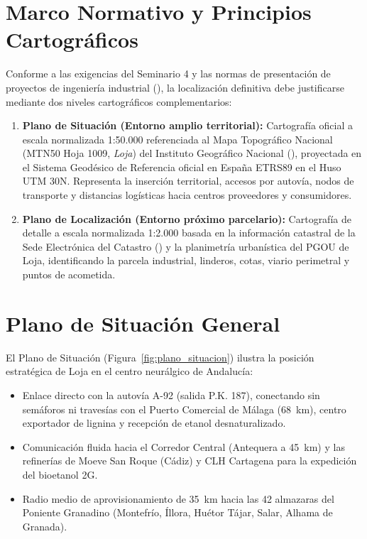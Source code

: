\documentclass{report}
\begin{document}
\section{Marco Normativo y Principios Cartográficos}
Conforme a las exigencias del Seminario 4 y las normas de presentación de proyectos de ingeniería industrial (\textcite{DeCos2008}), la localización definitiva debe justificarse mediante dos niveles cartográficos complementarios:
\begin{enumerate}
    \item \textbf{Plano de Situación (Entorno amplio territorial):} Cartografía oficial a escala normalizada 1:50.000 referenciada al Mapa Topográfico Nacional (MTN50 Hoja 1009, \textit{Loja}) del Instituto Geográfico Nacional (\textcite{IGN2026}), proyectada en el Sistema Geodésico de Referencia oficial en España ETRS89 en el Huso UTM 30N. Representa la inserción territorial, accesos por autovía, nodos de transporte y distancias logísticas hacia centros proveedores y consumidores.
    \item \textbf{Plano de Localización (Entorno próximo parcelario):} Cartografía de detalle a escala normalizada 1:2.000 basada en la información catastral de la Sede Electrónica del Catastro (\textcite{Catastro2026}) y la planimetría urbanística del PGOU de Loja, identificando la parcela industrial, linderos, cotas, viario perimetral y puntos de acometida.
\end{enumerate}

\section{Plano de Situación General}
El Plano de Situación (Figura~\ref{fig:plano_situacion}) ilustra la posición estratégica de Loja en el centro neurálgico de Andalucía:
\begin{itemize}
    \item Enlace directo con la autovía A-92 (salida P.K. 187), conectando sin semáforos ni travesías con el Puerto Comercial de Málaga (\SI{68}{\kilo\metre}), centro exportador de lignina y recepción de etanol desnaturalizado.
    \item Comunicación fluida hacia el Corredor Central (Antequera a \SI{45}{\kilo\metre}) y las refinerías de Moeve San Roque (Cádiz) y CLH Cartagena para la expedición del bioetanol 2G.
    \item Radio medio de aprovisionamiento de \SI{35}{\kilo\metre} hacia las \num{42} almazaras del Poniente Granadino (Montefrío, Íllora, Huétor Tájar, Salar, Alhama de Granada).
\end{itemize}
\end{document}
